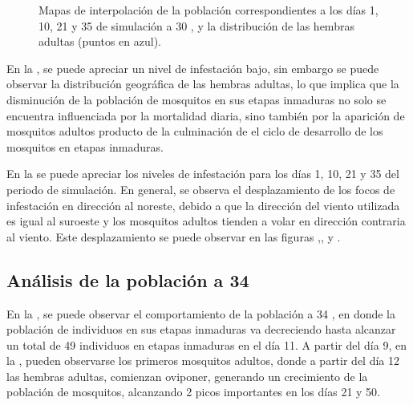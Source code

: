 \begin{figure}[!htbp]
    \caption{\label{fig:niveles-infestacion-30} Mapas de interpolación de la población correspondientes a los días 1, 10, 21 y 35 de simulación a 30 \textcelsius, y la distribución de las hembras adultas (puntos en azul). }
\end{figure}

En la , se puede apreciar un nivel de infestación bajo, sin
embargo se puede observar la distribución geográfica de las hembras adultas, lo que implica que la
disminución de la población de mosquitos en sus etapas inmaduras no solo se encuentra influenciada
por la mortalidad diaria, sino también por la aparición de mosquitos adultos producto de la culminación de el ciclo de desarrollo de los mosquitos en etapas inmaduras.

En la  se puede apreciar los niveles de infestación
para los días 1, 10, 21 y 35 del periodo de simulación. En general, se observa el
desplazamiento de los focos de infestación en dirección al noreste, debido a que la dirección del
viento utilizada es igual al suroeste y los mosquitos adultos tienden a volar en dirección
contraria al viento. Este desplazamiento se puede observar en las figuras
,,
 y .

\subsection{Análisis de la población a 34\textcelsius}
En la , se puede observar el comportamiento de la población a
34 \textcelsius, en donde la población de individuos en sus etapas inmaduras va decreciendo hasta
alcanzar un total de 49 individuos en etapas inmaduras en el día 11. A partir del día 9, en la
, pueden observarse los primeros mosquitos adultos, donde a
partir del día 12 las hembras adultas, comienzan oviponer, generando un crecimiento de la
población de mosquitos, alcanzando 2 picos importantes en los días 21 y 50.

